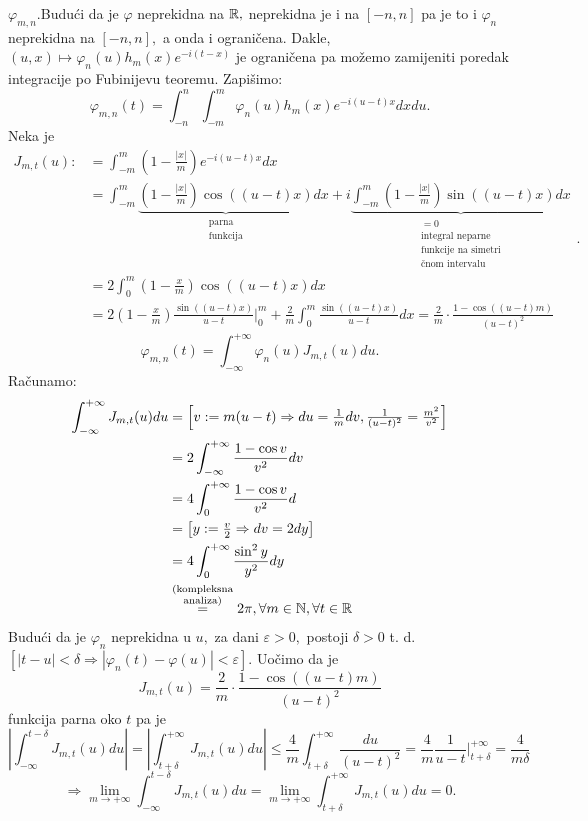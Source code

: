 \documentclass{article}
\begin{document}
\begin{itemize}
\(\varphi_{m,n}.\)\newline Budući da je \(\varphi\) neprekidna na \(\Bbb R,\) neprekidna je i na \([-n,n]\) pa je to i \(\varphi_n\) neprekidna na \([-n,n],\) a onda i ograničena. Dakle, \((u,x)\mapsto\varphi_n(u)h_m(x)e^{-i(t-x)}\) je ograničena pa možemo zamijeniti poredak integracije po Fubinijevu teoremu. Zapišimo: \[\varphi_{m,n}(t)=\int_{-n}^n\int_{-m}^m\varphi_n(u)h_m(x)e^{-i(u-t)x}dxdu.\] Neka je \[\begin{aligned}J_{m,t}(u):&=\int_{-m}^m\left(1-\frac{|x|}m\right)e^{-i(u-t)x}dx\\&=\int_{-m}^m\underbrace{\left(1-\frac{|x|}m\right)\cos((u-t)x)}_{\substack{\text{parna}\\\text{funkcija}}}dx+i\underbrace{\int_{-m}^m\left(1-\frac{|x|}m\right)\sin((u-t)x)dx}_{\substack{=0\\\text{integral neparne}\\\text{funkcije na simetri}\\\text{čnom intervalu}}}\\&=2\int_0^m\left(1-\frac{x}m\right)\cos((u-t)x)dx\\&=2\left(1-\frac{x}{m}\right)\frac{\sin((u-t)x)}{u-t}\big|_0^m+\frac2m\int_0^m\frac{\sin((u-t)x)}{u-t}dx=\frac2m\cdot\frac{1-\cos((u-t)m)}{(u-t)^2}\end{aligned}.\] \[\varphi_{m,n}(t)=\int_{-\infty}^{+\infty}\varphi_n(u)J_{m,t}(u)du.\] Računamo: \[\begin{aligned}\int_{-\infty}^{+\infty}J_{m,t}(u)du&=\begin{bmatrix}v:=m(u-t)\Rightarrow du=\frac1mdv,\frac1{(u-t)^2}=\frac{m^2}{v^2}\end{bmatrix}\\&=2\int_{-\infty}^{+\infty}\frac{1-\cos v}{v^2}dv\\&=4\int_0^{+\infty}\frac{1-\cos v}{v^2}d\\&=\begin{bmatrix}y:=\frac{v}2\Rightarrow dv=2dy\end{bmatrix}\\&=4\int_0^{+\infty}\frac{\sin^2y}{y^2}dy\\&\overset{\substack{\text{(kompleksna}\\\text{analiza)}}}{=}2\pi,\forall m\in\Bbb N,\forall t\in\Bbb R\end{aligned}\] Budući da je \(\varphi_n\) neprekidna u \(u,\) za dani \(\varepsilon>0,\) postoji \(\delta>0\) t. d. \([|t-u|<\delta\Rightarrow|\varphi_n(t)-\varphi(u)|<\varepsilon].\) Uočimo da je \[J_{m,t}(u)=\frac2m\cdot\frac{1-\cos((u-t)m)}{(u-t)^2}\] funkcija parna oko \(t\) pa je \[\left|\int_{-\infty}^{t-\delta}J_{m,t}(u)du\right|=\left|\int_{t+\delta}^{+\infty}J_{m,t}(u)du\right|\le\frac4m\int_{t+\delta}^{+\infty}\frac{du}{(u-t)^2}=\frac4m\frac1{u-t}\big|_{t+\delta}^{+\infty}=\frac4{m\delta}\] \[\Rightarrow\lim_{m\to+\infty}\int_{-\infty}^{t-\delta}J_{m,t}(u)du=\lim_{m\to+\infty}\int_{t+\delta}^{+\infty}J_{m,t}(u)du=0.\] 
\end{itemize}
\end{document}
